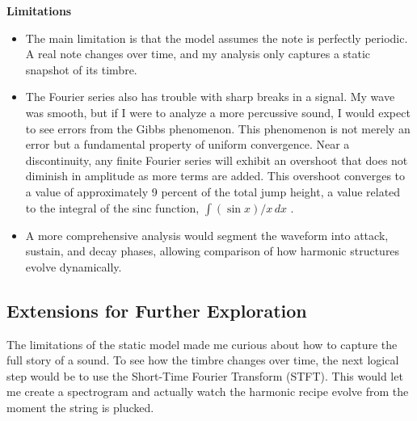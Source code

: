 \documentclass{article}
\begin{document}
\noindent \textbf{Limitations}
\begin{itemize}
    \item The main limitation is that the model assumes the note is perfectly periodic. A real note changes over time, and my analysis only captures a static snapshot of its timbre.
    \item The Fourier series also has trouble with sharp breaks in a signal. My wave was smooth, but if I were to analyze a more percussive sound, I would expect to see errors from the Gibbs phenomenon. This phenomenon is not merely an error but a fundamental property of uniform convergence. Near a discontinuity, any finite Fourier series will exhibit an overshoot that does not diminish in amplitude as more terms are added. This overshoot converges to a value of approximately 9 percent of the total jump height, a value related to the integral of the sinc function, $\int (\sin x)/x \,dx$ \cite{stein2003fourier}.
    \item A more comprehensive analysis would segment the waveform into attack, sustain, and decay phases, allowing comparison of how harmonic structures evolve dynamically.
\end{itemize}

\subsection{Extensions for Further Exploration}
The limitations of the static model made me curious about how to capture the full story of a sound. To see how the timbre changes over time, the next logical step would be to use the Short-Time Fourier Transform (STFT). This would let me create a spectrogram and actually watch the harmonic recipe evolve from the moment the string is plucked.
\end{document}
